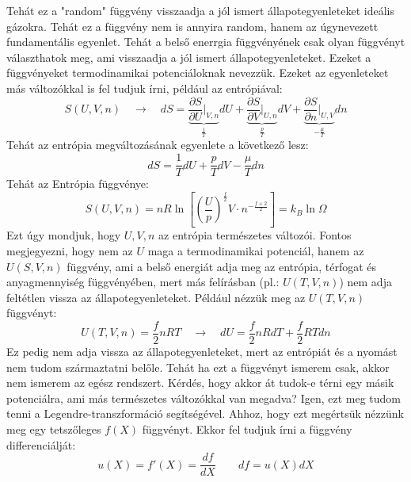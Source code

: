 \documentclass[../main.tex]{subfiles}
\begin{document}
Tehát ez a "random" függvény visszaadja a jól ismert állapotegyenleteket ideális gázokra. Tehát ez a függvény nem is annyira random, hanem az úgynevezett fundamentális egyenlet.
Tehát a belső enerrgia függvényének csak olyan függvényt választhatok meg, ami visszaadja a jól ismert állapotegyenleteket. Ezeket a függvényeket termodinamikai potenciáloknak nevezzük.
\newline
\newline
Ezeket az egyenleteket más változókkal is fel tudjuk írni, például az entrópiával:
\begin{equation}
    S(U, V, n) \quad \to \quad dS = \underbrace{\frac{\partial S}{\partial U}\bigg|_{V,n}}_{\frac{1}{T}} dU + \underbrace{\frac{\partial S}{\partial V}\bigg|_{U,n}}_{\frac{p}{T}} dV + \underbrace{\frac{\partial S}{\partial n}\bigg|_{U,V}}_{- \frac{\mu}{T}} dn
\end{equation}
Tehát az entrópia megváltozásának egyenlete a következő lesz:
\begin{equation}
    dS = \frac{1}{T} dU + \frac{p}{T} dV - \frac{\mu}{T} dn
\end{equation}
Tehát az Entrópia függvénye:
\begin{equation}
    S(U, V, n) = n R \ln{\left[\left(\frac{U}{p}\right)^{\frac{f}{2}} V \cdot n^{-\frac{f + 2}{2}} \right]} = k_B \ln{\Omega}
\end{equation}
Ezt úgy mondjuk, hogy $U, V, n$ az entrópia természetes változói.
\newline
\newline
Fontos megjegyezni, hogy nem az $U$ maga a termodinamikai potenciál, hanem az $U(S, V, n)$ függvény, ami a belső energiát adja meg az entrópia, térfogat és anyagmennyiség függvényében,
mert más felírásban (pl.: $U(T,V, n)$) nem adja feltétlen vissza az állapotegyenleteket. Például nézzük meg az $U(T, V, n)$ függvényt:
\begin{equation}
    U(T, V, n) = \frac{f}{2} n R T \quad \to \quad dU = \frac{f}{2} n R dT + \frac{f}{2} R T dn
\end{equation}
Ez pedig nem adja vissza az állapotegyenleteket, mert az entrópiát és a nyomást nem tudom származtatni belőle. Tehát ha ezt a függvényt ismerem csak,
akkor nem ismerem az egész rendszert. Kérdés, hogy akkor át tudok-e térni egy másik potenciálra, ami más természetes változókkal van megadva?
Igen, ezt meg tudom tenni a Legendre-transzformáció segítségével. Ahhoz, hogy ezt megértsük nézzünk meg egy tetszőleges $f(X)$ függvényt. Ekkor fel tudjuk írni a függvény differenciálját:
\begin{equation}
    u(X) = f'(X) = \frac{df}{dX} \qquad df = u(X) dX
\end{equation}
\end{document}
